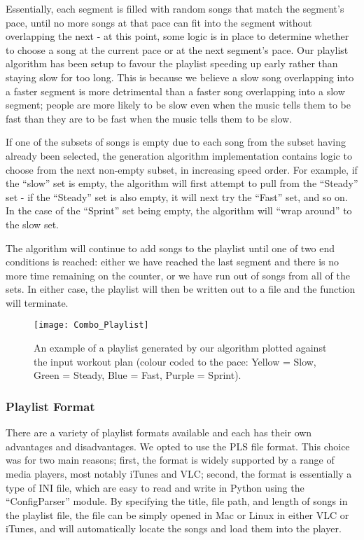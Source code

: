 \documentclass{article}
\begin{document}
Essentially, each segment is filled with random songs that match the segment's pace, until no more songs at that pace can fit into the segment without overlapping the next - at this point, some logic is in place to determine whether to choose a song at the current pace or at the next segment's pace. Our playlist algorithm has been setup to favour the playlist speeding up early rather than staying slow for too long. This is because we believe a slow song overlapping into a faster segment is more detrimental than a faster song overlapping into a slow segment; people are more likely to be slow even when the music tells them to be fast than they are to be fast when the music tells them to be slow.

If one of the subsets of songs is empty due to each song from the subset having already been selected, the generation algorithm implementation contains logic to choose from the next non-empty subset, in increasing speed order. For example, if the ``slow'' set is empty, the algorithm will first attempt to pull from the ``Steady'' set - if the ``Steady'' set is also empty, it will next try the ``Fast'' set, and so on. In the case of the ``Sprint'' set being empty, the algorithm will ``wrap around'' to the slow set.

The algorithm will continue to add songs to the playlist until one of two end conditions is reached: either we have reached the last segment and there is no more time remaining on the counter, or we have run out of songs from all of the sets. In either case, the playlist will then be written out to a file and the function will terminate.

\begin{figure}[h]
\centering
\captionsetup{justification=centering}
\texttt{[image: Combo\_Playlist]}
\caption{An example of a playlist generated by our algorithm plotted against the input workout plan (colour coded to the pace: Yellow = Slow, Green = Steady, Blue = Fast, Purple = Sprint).}
\label{fig:playlist}
\end{figure}

\subsubsection{Playlist Format}

There are a variety of playlist formats available \cite{Gonze} and each has their own advantages and disadvantages. We opted to use the PLS file format. This choice was for two main reasons; first, the format is widely supported by a range of media players, most notably iTunes and VLC; second, the format is essentially a type of INI file, which are easy to read and write in Python using the ``ConfigParser'' module. By specifying the title, file path, and length of songs in the playlist file, the file can be simply opened in Mac or Linux in either VLC or iTunes, and will automatically locate the songs and load them into the player.
\end{document}
